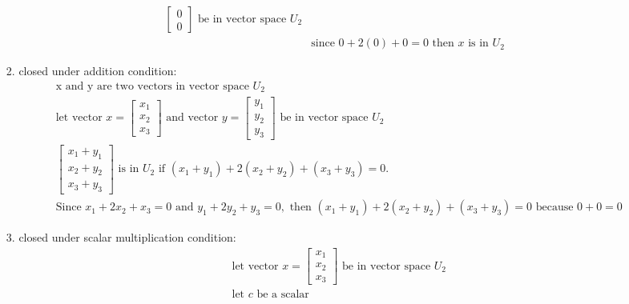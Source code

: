 \documentclass[11pt]{article}
\begin{document}
\begin{enumerate}
\begin{enumerate}
\begin{enumerate}
\[\begin{aligned}
\begin{bmatrix}
                0 \\
                0
            \end{bmatrix} \text{ be in vector space } U_2 \\
            &\text{since } 0 + 2(0) + 0 = 0 \text{ then } x \text{ is in } U_2
        \end{aligned}
        \]
        \item closed under addition condition:
        \[
        \begin{aligned}
            &\text{x and y are two vectors in  vector space } U_2 \\
            &\text{let vector } x = \begin{bmatrix}
                x_1 \\
                x_2 \\
                x_3
            \end{bmatrix} \text{ and vector } y = \begin{bmatrix}
                y_1 \\
                y_2 \\
                y_3
            \end{bmatrix} \text{ be in vector space } U_2 \\
            &\begin{bmatrix}
                x_1 + y_1 \\
                x_2 + y_2 \\
                x_3 + y_3
            \end{bmatrix} \text{ is in } U_2  \text{ if } (x_1 + y_1) + 2(x_2 + y_2) + (x_3 + y_3) = 0.\\ 
            &\text{Since } x_1 + 2x_2 + x_3 = 0 \text{ and } y_1 + 2y_2 + y_3 = 0, \text{ then } (x_1 + y_1) + 2(x_2 + y_2) + (x_3 + y_3) = 0 \text{ because } 0 + 0  = 0
        \end{aligned}
        \]
        \item closed under scalar multiplication condition:
        \[
        \begin{aligned}
            &\text{let vector } x = \begin{bmatrix}
                x_1 \\
                x_2 \\
                x_3
            \end{bmatrix} \text{ be in vector space } U_2 \\
            &\text{let } c \text{ be a scalar} \\

\end{aligned}\]
\end{enumerate}
\end{enumerate}
\end{enumerate}
\end{document}
